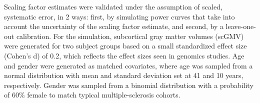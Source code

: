 Scaling factor estimates were validated under the assumption of scaled, systematic error, in 2 ways: first, by simulating power curves that take into account the uncertainty of the scaling factor estimate, and second, by a leave-one-out calibration. For the simulation, subcortical gray matter volumes (scGMV) were generated for two subject groups based on a small standardized effect size (Cohen's d) of 0.2, which reflects the effect sizes seen in genomics studies. Age and gender were generated as matched covariates, where age was sampled from a normal distribution with mean and standard deviation set at 41 and 10 years, respectively. Gender was sampled from a binomial distribution with a probability of 60\% female to match typical multiple-sclerosis cohorts. %